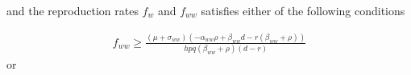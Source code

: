 \documentclass[11pt]{article}
\begin{document}

and the reproduction rates $f_w$ and $f_{ww}$ satisfies either of the following conditions


\begin{align}
	f_{ww} \geq \frac{(\mu + \sigma_{ww}) (-\alpha_{ww} \rho + \beta_{ww}d-r (\beta_{ww}+\rho ))}{h p q (\beta_{ww}+\rho ) (d-r)}
\end{align}
or
\end{document}
